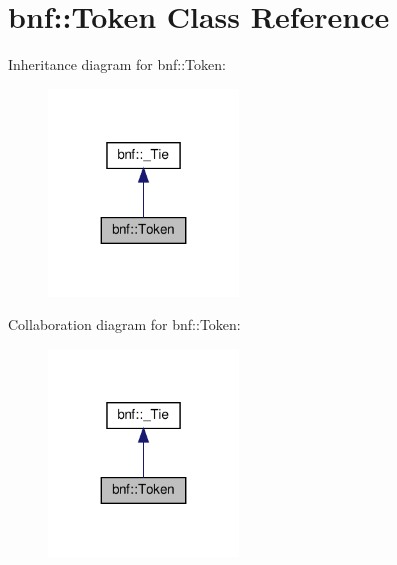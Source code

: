 \section{bnf\+:\+:Token Class Reference}
\label{classbnf_1_1_token}


Inheritance diagram for bnf\+:\+:Token\+:
\nopagebreak
\begin{figure}[H]
\begin{center}
\leavevmode
\includegraphics[width=143pt]{classbnf_1_1_token__inherit__graph}
\end{center}
\end{figure}


Collaboration diagram for bnf\+:\+:Token\+:
\nopagebreak
\begin{figure}[H]
\begin{center}
\leavevmode
\includegraphics[width=143pt]{classbnf_1_1_token__coll__graph}
\end{center}
\end{figure}

